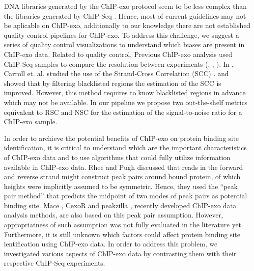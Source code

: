 \documentclass{bmcart}\usepackage[]{graphicx}\usepackage[]{color}
\begin{document}
DNA libraries generated by the ChIP-exo protocol seem to be less
complex than the libraries generated by ChIP-Seq
\cite{exo_review}. Hence, most of current guidelines \cite{encode_qc}
may not be aplicable on ChIP-exo, additionally to our knowledge there
are not established quality control pipelines for ChIP-exo. To address
this challenge, we suggest a series of quality control visualizations
to understand which biases are present in ChIP-exo data. Related to
quality control, Previous ChIP-exo analysis used ChIP-Seq samples to
compare the resolution between experiments (\cite{exo1}, \cite{exo2},
\cite{exoillumina}). In \cite{carroll.qc}, Carroll et. al. studied the
use of the Strand-Cross Correlation (SCC) \cite{strandcc}. and showed
that by filtering blacklisted regions the estimation of the SCC is
improved. However, this method requires to know blacklisted regions in
advance which may not be available. In our pipeline we propose two
out-the-shelf metrics equivalent to RSC and NSC for the estimation of
the signal-to-noise ratio for a ChIP-exo sample.

In order to archieve the potential benefits of ChIP-exo on protein
binding site identification, it is critical to understand which are
the important characteristics of ChIP-exo data and to use algorithms
that could fully utilize information available in ChIP-exo data. Rhee
and Pugh \cite{exo1} discussed that reads in the forward and reverse
strand might construct peak pairs around bound protein, of which
heights were implicitly assumed to be symmetric. Hence, they used the
``peak pair method'' that predicts the midpoint of two modes of peak
pairs as potential binding site. Mace \cite{mace}, CexoR \cite{cexor}
and peakzilla \cite{peakzilla}, recently developed ChIP-exo data
analysis methods, are also based on this peak pair
assumption. However, appropriatness of such assumption was not fully
evaluated in the literature yet.  Furthermore, it is still unknown
which factors could affect protein binding site ientification using
ChIP-exo data. In order to address this problem, we investigated
various aspects of ChIP-exo data by contrasting them with their
respective ChIP-Seq experiments.
\end{document}
